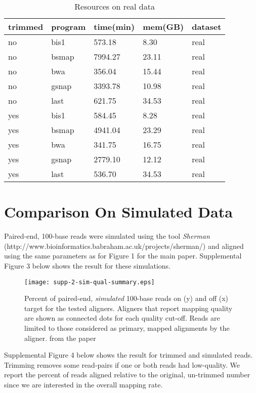 \documentclass[12pt]{article}
\begin{document}
\begin{table}[H]
    \centering
    \caption{Resources on real data}
    \begin{tabular}{lllll} \hline
    trimmed & program & time(min) & mem(GB) & dataset \\ \hline
    no      & bis1    & 573.18    & 8.30    & real    \\
    no      & bsmap   & 7994.27   & 23.11   & real    \\
    no      & bwa     & 356.04    & 15.44   & real    \\
    no      & gsnap   & 3393.78   & 10.98   & real    \\
    no      & last    & 621.75    & 34.53   & real    \\
    yes     & bis1    & 584.45    & 8.28    & real    \\
    yes     & bsmap   & 4941.04   & 23.29   & real    \\
    yes     & bwa     & 341.75    & 16.75   & real    \\
    yes     & gsnap   & 2779.10   & 12.12   & real    \\
    yes     & last    & 536.70    & 34.53   & real    \\
    \end{tabular}
\end{table}

\section{Comparison On Simulated Data}
Paired-end, 100-base reads were simulated using the tool \emph{Sherman} (http://www.bioinformatics.babraham.ac.uk/projects/sherman/) and aligned using the
same parameters as for Figure 1 for the main paper.
Supplemental Figure 3 below shows the result for these simulations.


\begin{figure}[H]%
    \centerline{\texttt{[image: supp-2-sim-qual-summary.eps]}}
    \caption{Percent of paired-end, \emph{simulated} 100-base reads on (y) and off (x) target for the tested aligners. Aligners that report mapping quality are shown as connected dots for each quality cut-off. Reads are limited to those considered as primary, mapped alignments by the aligner.
from the paper}\label{suppfig:03}
\end{figure}

Supplemental Figure 4 below shows the result for trimmed and simulated reads.
Trimming removes some read-pairs if one or both reads had low-quality. We
report the percent of reads aligned relative to the original, un-trimmed number
since we are interested in the overall mapping rate.
\end{document}
